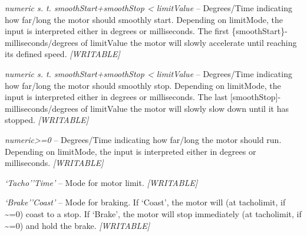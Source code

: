 \documentclass[letterpaper,10pt,english]{sphinxmanual}
\begin{document}
\begin{fulllineitems}
\begin{fulllineitems}
\label{source:source.Motor.smoothStart}
\emph{numeric s. t. smoothStart+smoothStop \textless{} limitValue} -- Degrees/Time
indicating how far/long the motor should smoothly start. Depending on limitMode,
the input is interpreted either in degrees or milliseconds. The first
\{smoothStart\}-milliseconds/degrees of limitValue the motor will slowly accelerate
until reaching its defined speed. \emph{{[}WRITABLE{]}}

\end{fulllineitems}


\begin{fulllineitems}
\label{source:source.Motor.smoothStop}
\emph{numeric s. t. smoothStart+smoothStop \textless{} limitValue} -- Degrees/Time
indicating how far/long the motor should smoothly stop. Depending on limitMode, the
input is interpreted either in degrees or milliseconds. The last
{[}smoothStop{]}-milliseconds/degrees of limitValue the motor will slowly slow down
until it has stopped. \emph{{[}WRITABLE{]}}

\end{fulllineitems}


\begin{fulllineitems}
\label{source:source.Motor.limitValue}
\emph{numeric\textgreater{}=0} -- Degrees/Time indicating how far/long the motor should run.
Depending on limitMode, the input is interpreted either in degrees or
milliseconds. \emph{{[}WRITABLE{]}}

\end{fulllineitems}


\begin{fulllineitems}
\label{source:source.Motor.limitMode}
\emph{`Tacho'\textbar{}'Time'} -- Mode for motor limit. \emph{{[}WRITABLE{]}}

\end{fulllineitems}


\begin{fulllineitems}
\label{source:source.Motor.brakeMode}
\emph{`Brake'\textbar{}'Coast'} -- Mode for braking. If `Coast', the motor will (at
tacholimit, if \textasciitilde{}=0) coast to a stop. If `Brake', the motor will stop immediately
(at tacholimit, if \textasciitilde{}=0) and hold the brake. \emph{{[}WRITABLE{]}}


\end{fulllineitems}
\end{fulllineitems}
\end{document}
